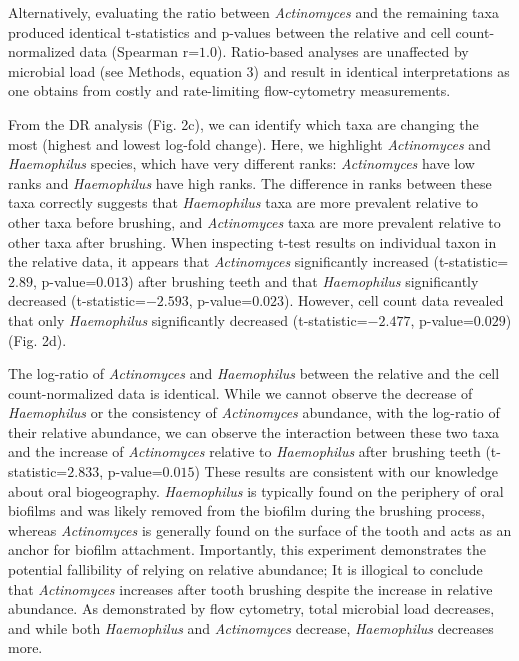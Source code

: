 Alternatively, evaluating the ratio between \textit{Actinomyces} and the remaining taxa produced identical t-statistics and p-values between the relative and cell count-normalized data (Spearman r=$1.0$). Ratio-based analyses are unaffected by microbial load (see Methods, equation 3) and result in identical interpretations as one obtains from costly and rate-limiting flow-cytometry measurements.

From the DR analysis (Fig. 2c), we can identify which taxa are changing the most (highest and lowest log-fold change). Here, we highlight \textit{Actinomyces} and \textit{Haemophilus} species, which have very different ranks: \textit{Actinomyces} have low ranks and \textit{Haemophilus} have high ranks. The difference in ranks between these taxa correctly suggests that \textit{Haemophilus} taxa are more prevalent relative to other taxa before brushing, and \textit{Actinomyces} taxa are more prevalent relative to other taxa after brushing. When inspecting t-test results on individual taxon in the relative data, it appears that \textit{Actinomyces} significantly increased (t-statistic=$2.89$, p-value=$0.013$) after brushing teeth and that \textit{Haemophilus} significantly decreased (t-statistic=$-2.593$, p-value=$0.023$). However, cell count data revealed that only \textit{Haemophilus} significantly decreased (t-statistic=$-2.477$, p-value=$0.029$) (Fig. 2d).

The log-ratio of \textit{Actinomyces} and \textit{Haemophilus} between the relative and the cell count-normalized data is identical. While we cannot observe the decrease of \textit{Haemophilus} or the consistency of \textit{Actinomyces} abundance, with the log-ratio of their relative abundance, we can observe the interaction between these two taxa and the increase of \textit{Actinomyces} relative to \textit{Haemophilus} after brushing teeth (t-statistic=$2.833$, p-value=$0.015$)
These results are consistent with our knowledge about oral biogeography. \textit{Haemophilus} is typically found on the periphery of oral biofilms and was likely removed from the biofilm during the brushing process, whereas \textit{Actinomyces} is generally found on the surface of the tooth and acts as an anchor for biofilm attachment\cite{Welch2016-lw}. Importantly, this experiment demonstrates the potential fallibility of relying on relative abundance; It is illogical to conclude that \textit{Actinomyces} increases after tooth brushing despite the increase in relative abundance. As demonstrated by flow cytometry, total microbial load decreases, and while both \textit{Haemophilus} and \textit{Actinomyces} decrease, \textit{Haemophilus} decreases more.

